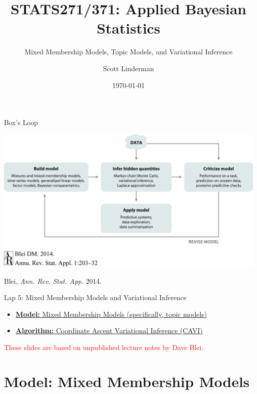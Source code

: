 \documentclass[aspectratio=169]{beamer}
\title{STATS271/371: Applied Bayesian Statistics}
\subtitle{Mixed Membership Models, Topic Models, and Variational Inference}
\author{Scott Linderman}
\date{\today}
\begin{document}
\maketitle

\begin{frame}{Box's Loop}
\begin{center}
\includegraphics[width=.85\linewidth]{figures/lap1/boxsloop.jpeg}\\
\end{center} 
\begin{flushright}
{\footnotesize Blei, \textit{Ann. Rev. Stat. App.} 2014.}
\end{flushright}
\end{frame}

\begin{frame}{Lap 5: Mixed Membership Models and Variational Inference}
\begin{itemize}
    \item \hyperref[sec:models]{\textbf{Model:} Mixed Membership Models (specifically, topic models)}
    \item \hyperref[sec:cavi]{\textbf{Algorithm:} Coordinate Ascent Variational Inference (CAVI)}
\end{itemize}

\vspace{3em}

\begin{center}
    {\Large \textcolor{red}{These slides are based on unpublished lecture notes by Dave Blei.}}
\end{center}

\end{frame}


\section{Model: Mixed Membership Models}
\label{sec:models}
\end{document}
